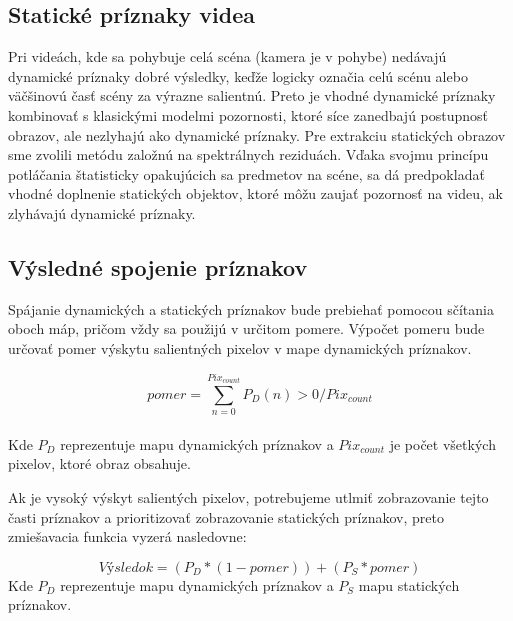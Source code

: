 \subsection{Statické príznaky videa}
Pri videách, kde sa pohybuje celá scéna (kamera je v pohybe) nedávajú dynamické príznaky dobré výsledky, keďže logicky označia celú scénu alebo väčšinovú časť scény za výrazne salientnú.
Preto je vhodné dynamické príznaky kombinovať s klasickými modelmi pozornosti, ktoré síce zanedbajú postupnosť obrazov, ale nezlyhajú ako dynamické príznaky.
Pre extrakciu statických obrazov sme zvolili metódu založnú na spektrálnych reziduách\cite{spectral-rezidual}.
Vďaka svojmu princípu potláčania štatisticky opakujúcich sa predmetov na scéne, sa dá predpokladať vhodné doplnenie statických objektov, ktoré môžu zaujať pozornosť na videu, ak zlyhávajú dynamické príznaky.

\subsection{Výsledné spojenie príznakov}
Spájanie dynamických a statických príznakov bude prebiehať pomocou sčítania oboch máp, pričom vždy sa použijú v určitom pomere.
Výpočet pomeru bude určovať pomer výskytu salientných pixelov v mape dynamických príznakov.

\begin{equation}
pomer = \sum_{n=0}^{Pix_{count}} P_D(n) > 0 / Pix_{count}
\end{equation}
\\
Kde \begin{math}P_D\end{math} reprezentuje mapu dynamických príznakov a \begin{math}Pix_{count}\end{math} je počet všetkých pixelov, ktoré obraz obsahuje.

Ak je vysoký výskyt salientých pixelov, potrebujeme utlmiť zobrazovanie tejto časti príznakov a prioritizovať zobrazovanie statických príznakov, preto zmiešavacia funkcia vyzerá nasledovne:

\begin{equation}
  Výsledok = (P_D * (1-pomer)) + (P_S * pomer)
\end{equation}
Kde \begin{math}P_D\end{math} reprezentuje mapu dynamických príznakov a \begin{math}P_S\end{math} mapu statických príznakov.

